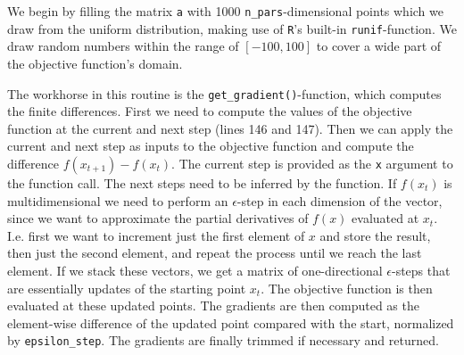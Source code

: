 \documentclass{article}
\begin{document}


We begin by filling the matrix \texttt{a} with 1000 \texttt{n\_pars}-dimensional points which we draw from the uniform distribution, making use of \texttt{R}'s built-in \texttt{runif}-function. We draw random numbers within the range of $[-100, 100]$ to cover a wide part of the objective function's domain.  



The workhorse in this routine is the \texttt{get\_gradient()}-function, which computes the finite differences. First we need to compute the values of the objective function at the current and next step (lines 146 and 147). Then we can apply the current and next step as inputs to the objective function and compute the difference $f(x_{t+1}) - f(x_t)$. The current step is provided as the \texttt{x} argument to the function call. The next steps need to be inferred by the function. If $f(x_t)$ is multidimensional we need to perform an $\epsilon$-step in each dimension of the vector, since we want to approximate the partial derivatives of $f(x)$ evaluated at $x_t$. I.e. first we want to increment just the first element of $x$ and store the result, then just the second element, and repeat the process until we reach the last element. If we stack these vectors, we get a matrix of one-directional $\epsilon$-steps that are essentially updates of the starting point $x_t$. The objective function is then evaluated at these updated points. The gradients are then computed as the element-wise difference of the updated point compared with the start, normalized by \texttt{epsilon\_step}. The gradients are finally trimmed if necessary and returned.
\end{document}
